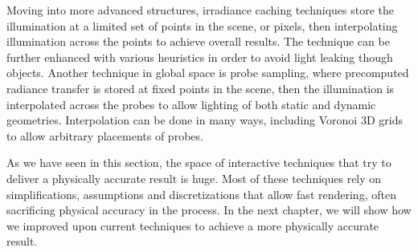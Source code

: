 Moving into more advanced structures, irradiance caching techniques store the illumination at a limited set of points in the scene, or pixels, then interpolating illumination across the points to achieve overall results. The technique can be further enhanced with various heuristics in order to avoid light leaking though objects. Another technique in global space is probe sampling, where precomputed radiance transfer is stored at fixed points in the scene, then the illumination is interpolated across the probes to allow lighting of both static and dynamic geometries. Interpolation can be done in many ways, including Voronoi 3D grids to allow arbitrary placements of probes.

As we have seen in this section, the space of interactive techniques that try to deliver a physically accurate result is huge. Most of these techniques rely on simplifications, assumptions and discretizations that allow fast rendering, often sacrificing physical accuracy in the process. In the next chapter, we will show how we improved upon current techniques to achieve a more physically accurate result.
